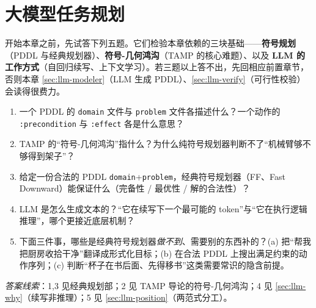 \chapter{大模型任务规划}
\label{ch:llm-task-planning}



\begin{practice}[前置自测]
开始本章之前，先试答下列五题。它们检验本章依赖的三块基础——\textbf{符号规划}（PDDL 与经典规划器）、\textbf{符号-几何鸿沟}（TAMP 的核心难题）、以及 \textbf{LLM 的工作方式}（自回归续写、上下文学习）。若三题以上答不出，先回相应前置章节，否则本章 \cref{sec:llm-modeler}（LLM 生成 PDDL）、\cref{sec:llm-verify}（可行性校验）会读得很费力。
\begin{enumerate}
  \item 一个 PDDL 的 \texttt{domain} 文件与 \texttt{problem} 文件各描述什么？一个动作的 \texttt{:precondition} 与 \texttt{:effect} 各是什么意思？
  \item TAMP 的“符号-几何鸿沟”指什么？为什么纯符号规划器判断不了“机械臂够不够得到架子”？
  \item 给定一份合法的 PDDL \texttt{domain}+\texttt{problem}，经典符号规划器（FF、Fast Downward）能保证什么（完备性 / 最优性 / 解的合法性）？
  \item LLM 是怎么生成文本的？“它在续写下一个最可能的 token”与“它在执行逻辑推理”，哪个更接近底层机制？
  \item 下面三件事，哪些是经典符号规划器\emph{做不到}、需要别的东西补的？(a) 把“帮我把厨房收拾干净”翻译成形式化目标；(b) 在合法 PDDL 上搜出满足约束的动作序列；(c) 判断“杯子在书后面、先得移书”这类需要常识的隐含前提。
\end{enumerate}
\noindent\emph{答案线索}：1,3 见经典规划部；2 见 TAMP 导论的符号-几何鸿沟；4 见 \cref{sec:llm-why}（续写非推理）；5 见 \cref{sec:llm-position}（两范式分工）。
\end{practice}

